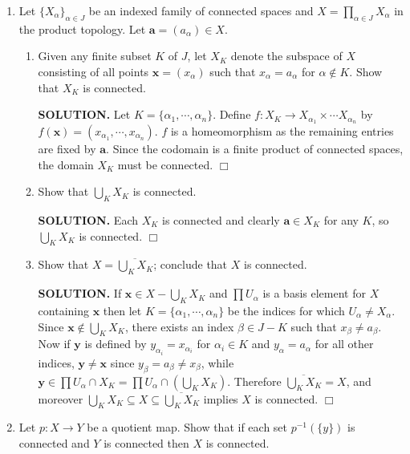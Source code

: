 \documentclass{article}
\begin{document}
\begin{enumerate}
    \item Let $\{X_\alpha\}_{\alpha \in J}$ be an indexed family of connected spaces and $X = \prod_{\alpha \in J} X_\alpha$ in the product topology. Let $\mathbf{a} = (a_\alpha) \in X$.
    \begin{enumerate}
        \item Given any finite subset $K$ of $J$, let $X_K$ denote the subspace of $X$ consisting of all points $\mathbf{x} = (x_\alpha)$ such that $x_\alpha = a_\alpha$ for $\alpha \notin K$. Show that $X_K$ is connected.

        {\bf SOLUTION.} Let $K = \{\alpha_1, \cdots, \alpha_n\}$. Define $f: X_K \rightarrow X_{\alpha_1} \times \cdots X_{\alpha_n}$ by $f(\mathbf{x}) = (x_{\alpha_1}, \cdots, x_{\alpha_n})$. $f$ is a homeomorphism as the remaining entries are fixed by $\mathbf{a}$. Since the codomain is a finite product of connected spaces, the domain $X_K$ must be connected. $\Box$

        \item Show that $\bigcup_K X_K$ is connected.

        {\bf SOLUTION.} Each $X_K$ is connected and clearly $\mathbf{a} \in X_K$ for any $K$, so $\bigcup_K X_K$ is connected. $\Box$

        \item Show that $X = \overline{\bigcup_K X_K}$; conclude that $X$ is connected.
        
        {\bf SOLUTION.} If $\mathbf{x} \in X - \bigcup_K X_K$ and $\prod U_\alpha$ is a basis element for $X$ containing $\mathbf{x}$ then let $K = \{\alpha_1, \cdots, \alpha_n\}$ be the indices for which $U_\alpha \neq X_\alpha$. Since $\mathbf{x} \notin \bigcup_K X_K$, there exists an index $\beta \in J - K$ such that $x_\beta \neq a_\beta$. Now if $\mathbf{y}$ is defined by $y_{\alpha_i} = x_{\alpha_i}$ for $\alpha_i \in K$ and $y_\alpha = a_\alpha$ for all other indices, $\mathbf{y} \neq \mathbf{x}$ since $y_\beta = a_\beta \neq x_\beta$, while $\mathbf{y} \in \prod U_\alpha \cap X_K = \prod U_\alpha \cap (\bigcup_K X_K).$ Therefore $\overline{\bigcup_K X_K} = X$, and moreover $\bigcup_K X_K \subseteq X \subseteq \overline{\bigcup_K X_K}$ implies $X$ is connected. $\Box$
    \end{enumerate}

    \item Let $p: X \rightarrow Y$ be a quotient map. Show that if each set $p^{-1}(\{y\})$ is connected and $Y$ is connected then $X$ is connected.


\end{enumerate}
\end{document}
